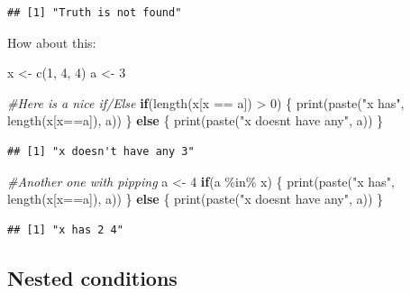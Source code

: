\documentclass[
]{book}
\newenvironment{Shaded}{\begin{snugshade}}{\end{snugshade}}
\newcommand{\CommentTok}[1]{\textcolor[rgb]{0.56,0.35,0.01}{\textit{#1}}}
\newcommand{\ControlFlowTok}[1]{\textcolor[rgb]{0.13,0.29,0.53}{\textbf{#1}}}
\newcommand{\DecValTok}[1]{\textcolor[rgb]{0.00,0.00,0.81}{#1}}
\newcommand{\FunctionTok}[1]{\textcolor[rgb]{0.00,0.00,0.00}{#1}}
\newcommand{\NormalTok}[1]{#1}
\newcommand{\OtherTok}[1]{\textcolor[rgb]{0.56,0.35,0.01}{#1}}
\newcommand{\SpecialCharTok}[1]{\textcolor[rgb]{0.00,0.00,0.00}{#1}}
\newcommand{\StringTok}[1]{\textcolor[rgb]{0.31,0.60,0.02}{#1}}
\begin{document}
\begin{verbatim}
## [1] "Truth is not found"
\end{verbatim}

How about this:

\begin{Shaded}
\begin{Highlighting}[]
\NormalTok{x }\OtherTok{\textless{}{-}} \FunctionTok{c}\NormalTok{(}\DecValTok{1}\NormalTok{, }\DecValTok{4}\NormalTok{, }\DecValTok{4}\NormalTok{)}
\NormalTok{a }\OtherTok{\textless{}{-}} \DecValTok{3}

\CommentTok{\#Here is a nice if/Else}
\ControlFlowTok{if}\NormalTok{(}\FunctionTok{length}\NormalTok{(x[x }\SpecialCharTok{==}\NormalTok{ a]) }\SpecialCharTok{\textgreater{}} \DecValTok{0}\NormalTok{) \{}
  \FunctionTok{print}\NormalTok{(}\FunctionTok{paste}\NormalTok{(}\StringTok{"x has"}\NormalTok{, }\FunctionTok{length}\NormalTok{(x[x}\SpecialCharTok{==}\NormalTok{a]), a))}
\NormalTok{\} }\ControlFlowTok{else}\NormalTok{ \{}
  \FunctionTok{print}\NormalTok{(}\FunctionTok{paste}\NormalTok{(}\StringTok{"x doesn\textquotesingle{}t have any"}\NormalTok{, a))}
\NormalTok{\}}
\end{Highlighting}
\end{Shaded}

\begin{verbatim}
## [1] "x doesn't have any 3"
\end{verbatim}

\begin{Shaded}
\begin{Highlighting}[]
\CommentTok{\#Another one with pipping}
\NormalTok{a }\OtherTok{\textless{}{-}} \DecValTok{4}
\ControlFlowTok{if}\NormalTok{(a }\SpecialCharTok{\%in\%}\NormalTok{ x) \{}
  \FunctionTok{print}\NormalTok{(}\FunctionTok{paste}\NormalTok{(}\StringTok{"x has"}\NormalTok{, }\FunctionTok{length}\NormalTok{(x[x}\SpecialCharTok{==}\NormalTok{a]), a))}
\NormalTok{\} }\ControlFlowTok{else}\NormalTok{ \{}
  \FunctionTok{print}\NormalTok{(}\FunctionTok{paste}\NormalTok{(}\StringTok{"x doesn\textquotesingle{}t have any"}\NormalTok{, a))}
\NormalTok{\}}
\end{Highlighting}
\end{Shaded}

\begin{verbatim}
## [1] "x has 2 4"
\end{verbatim}

\hypertarget{nested-conditions}{%
\subsection{Nested conditions}\label{nested-conditions}}
\end{document}
